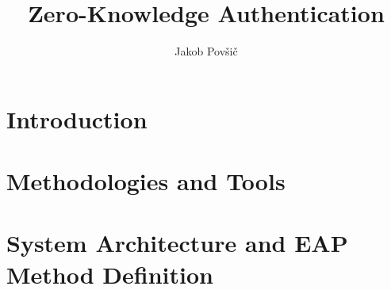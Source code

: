 \documentclass[12pt]{report}
\title{Zero-Knowledge Authentication}
\author{Jakob Povšič}
\theoremstyle{definition}
\begin{document}

\maketitle
\newpage

\tableofcontents
\newpage




\chapter{Introduction}
\label{chapter:1}


\chapter{Methodologies and Tools}
\label{chapter:2}







\chapter{System Architecture and EAP Method Definition}
\label{chapter:3}





%


\end{document}
